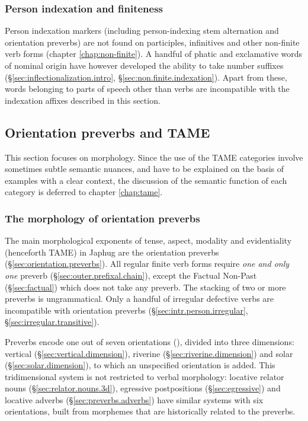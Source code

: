 \subsubsection{Person indexation and finiteness} \label{sec:indexation.finiteness.intro}
Person indexation markers (including person-indexing stem alternation and orientation preverbs) are not found on participles, infinitives and other non-finite verb forms (chapter \ref{chap:non-finite}). A handful of phatic and exclamative words of nominal origin have however developed the ability to take number suffixes (§\ref{sec:inflectionalization.intro}, §\ref{sec:non.finite.indexation}). Apart from these, words belonging to parts of speech other than verbs are incompatible with the indexation affixes described in this section.


\subsection{Orientation preverbs and TAME}
This section focuses on morphology. Since the use of the TAME categories involve sometimes subtle semantic nuances, and have to be explained on the basis of examples with a clear context, the discussion of the semantic function of each category is deferred to chapter \ref{chap:tame}.

\subsubsection{The morphology of orientation preverbs}
The main morphological exponents of tense, aspect, modality and evidentiality (henceforth TAME) in Japhug are the orientation preverbs (§\ref{sec:orientation.preverbs}). All regular finite verb forms require \textit{one and only one} preverb (§\ref{sec:outer.prefixal.chain}), except the Factual Non-Past (§\ref{sec:factual}) which does not take any preverb. The stacking of two or more preverbs is ungrammatical. Only a handful of irregular defective verbs are incompatible with orientation preverbs (§\ref{sec:intr.person.irregular}, §\ref{sec:irregular.transitive}).

Preverbs encode one out of seven orientations (), divided into three dimensions: vertical (§\ref{sec:vertical.dimension}), riverine (§\ref{sec:riverine.dimension}) and solar (§\ref{sec:solar.dimension}), to which an unspecified orientation is added. This tridimensional system is not restricted to verbal morphology: locative relator nouns (§\ref{sec:relator.nouns.3d}), egressive postpositions (§\ref{sec:egressive}) and locative adverbs (§\ref{sec:preverbs.adverbs}) have similar systems with six orientations, built from morphemes that are historically related to the preverbs.

